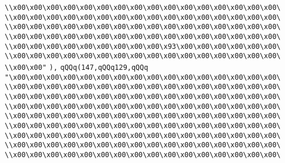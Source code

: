 \verb|\\x00\x00\x00\x00\x00\x00\x00\x00\x00\x00\x00\x00\x00\x00\x00\x00\|\newline
\verb|\\x00\x00\x00\x00\x00\x00\x00\x00\x00\x00\x00\x00\x00\x00\x00\x00\|\newline
\verb|\\x00\x00\x00\x00\x00\x00\x00\x00\x00\x00\x00\x00\x00\x00\x00\x00\|\newline
\verb|\\x00\x00\x00\x00\x00\x00\x00\x00\x00\x00\x00\x00\x00\x00\x00\x00\|\newline
\verb|\\x00\x00\x00\x00\x00\x00\x00\x00\x00\x93\x00\x00\x00\x00\x00\x00\|\newline
\verb|\\x00\x00\x00\x00\x00\x00\x00\x00\x00\x00\x00\x00\x00\x00\x00\x00\|\newline
\verb|\\x00\x00"|\newline
\verb|),|\newline
\verb|qQQq(147,qQQq129,qQQq|\newline
\verb|"\x00\x00\x00\x00\x00\x00\x00\x00\x00\x00\x00\x00\x00\x00\x00\x00\|\newline
\verb|\\x00\x00\x00\x00\x00\x00\x00\x00\x00\x00\x00\x00\x00\x00\x00\x00\|\newline
\verb|\\x00\x00\x00\x00\x00\x00\x00\x00\x00\x00\x00\x00\x00\x00\x00\x00\|\newline
\verb|\\x00\x00\x00\x00\x00\x00\x00\x00\x00\x00\x00\x00\x00\x00\x00\x00\|\newline
\verb|\\x00\x00\x00\x00\x00\x00\x00\x00\x00\x00\x00\x00\x00\x00\x00\x00\|\newline
\verb|\\x00\x00\x00\x00\x00\x00\x00\x00\x00\x00\x00\x00\x00\x00\x00\x00\|\newline
\verb|\\x00\x00\x00\x00\x00\x00\x00\x00\x00\x00\x00\x00\x00\x00\x00\x00\|\newline
\verb|\\x00\x00\x00\x00\x00\x00\x00\x00\x00\x00\x00\x00\x00\x00\x00\x00\|\newline
\verb|\\x00\x00\x00\x00\x00\x00\x00\x00\x00\x00\x00\x00\x00\x00\x00\x00\|\newline
